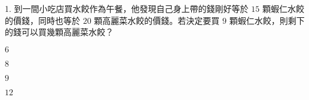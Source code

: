 \documentclass[12pt]{article}
\begin{document}
\begin{problem}
  \item[1.] 到一間小吃店買水餃作為午餐，他發現自己身上帶的錢剛好等於 $15$ 顆蝦仁水餃的價錢，同時也等於 $20$ 顆高麗菜水餃的價錢。若決定要買 $9$ 顆蝦仁水餃，則剩下的錢可以買幾顆高麗菜水餃？
  \begin{choices}
    \item $6$
    \item $8$
    \item $9$
    \item $12$
  \end{choices}
\end{problem}
\end{document}
